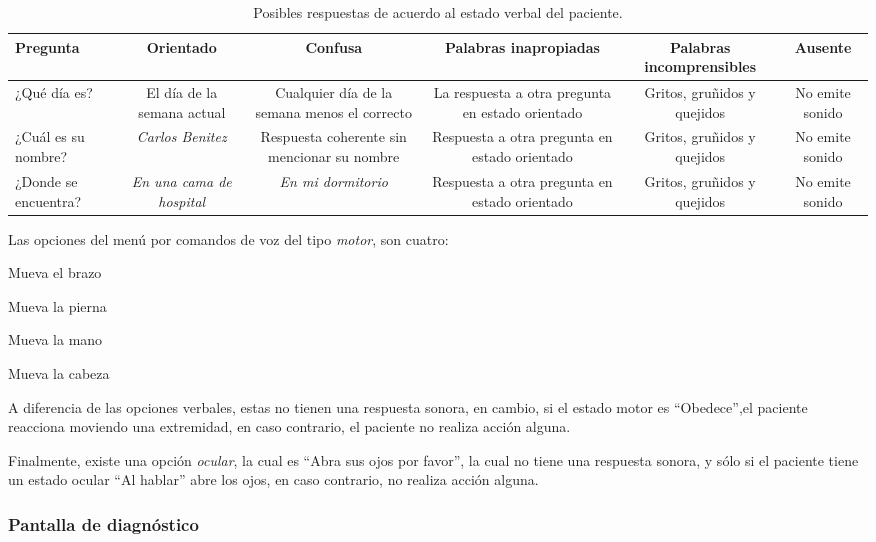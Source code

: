 \begin{table}[H]
\centering
\begin{tabulary}{1.2\textwidth}{LCCCCC}
\toprule
\textbf{Pregunta} & \textbf{Orientado} & \textbf{Confusa} & \textbf{Palabras
    inapropiadas} & \textbf{Palabras incomprensibles} & \textbf{Ausente} \\
\midrule
¿Qué día es? & El día de la semana actual & Cualquier día de la semana menos el
correcto & La respuesta a otra pregunta en estado orientado & Gritos, gruñidos y
quejidos & No emite sonido \\
¿Cuál es su nombre? & \emph{Carlos Benitez} & Respuesta coherente sin mencionar
su nombre & Respuesta a otra pregunta en estado orientado & Gritos, gruñidos y
quejidos & No emite sonido \\
¿Donde se encuentra? & \emph{En una cama de hospital} & \emph{En mi dormitorio} &
Respuesta a otra pregunta en estado orientado & Gritos, gruñidos y quejidos & No
emite sonido \\
\bottomrule
\end{tabulary}
\caption{Posibles respuestas de acuerdo al estado verbal del paciente.}
\label{tab:glasgow_opciones_respuesta}
\end{table}

Las opciones del menú por comandos de voz del tipo \emph{motor}, son cuatro: 

\begin{itemize*}
    \item Mueva el brazo
    \item Mueva la pierna
    \item Mueva la mano
    \item Mueva la cabeza
\end{itemize*}

A diferencia de las opciones verbales, estas no tienen una respuesta sonora, en
cambio, si el estado motor es \enquote{Obedece},el paciente reacciona moviendo
una extremidad, en caso contrario, el paciente no realiza acción alguna.

Finalmente, existe una opción \emph{ocular}, la cual es \enquote{Abra sus ojos por
favor}, la cual no tiene una respuesta sonora, y sólo si el paciente tiene un
estado ocular \enquote{Al hablar} abre los ojos, en caso contrario, no realiza
acción alguna.

\subsubsection{Pantalla de diagnóstico}

